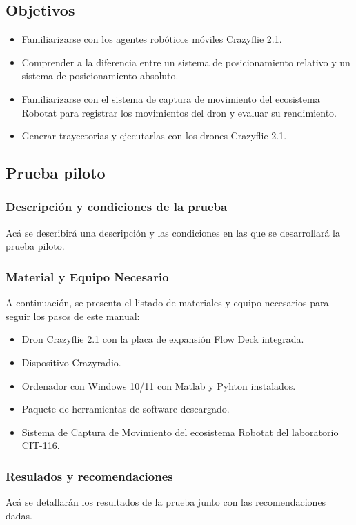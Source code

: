 \subsection{Objetivos}
\begin{itemize}
	\item Familiarizarse con los agentes robóticos móviles Crazyflie 2.1.
	\item Comprender a la diferencia entre un sistema de posicionamiento relativo y un sistema de posicionamiento absoluto.
	\item Familiarizarse con el sistema de captura de movimiento del ecosistema Robotat para registrar los movimientos del dron y evaluar su rendimiento.
	\item Generar trayectorias y ejecutarlas con los drones Crazyflie 2.1.
\end{itemize}

\subsection{Prueba piloto}
\subsubsection{Descripción y condiciones de la prueba}
Acá se describirá una descripción y las condiciones en las que se desarrollará la prueba piloto.

\subsubsection{Material y Equipo Necesario}
A continuación, se presenta el listado de materiales y equipo necesarios para seguir los pasos de este manual:

\begin{itemize}
	\item Dron Crazyflie 2.1 con la placa de expansión Flow Deck integrada.
	\item Dispositivo Crazyradio.
	\item Ordenador con Windows 10/11 con Matlab y Pyhton instalados.
	\item Paquete de herramientas de software descargado.
	\item Sistema de Captura de Movimiento del ecosistema Robotat del laboratorio CIT-116.
\end{itemize}

\subsubsection{Resulados y recomendaciones}
Acá se detallarán los resultados de la prueba junto con las recomendaciones dadas. 
